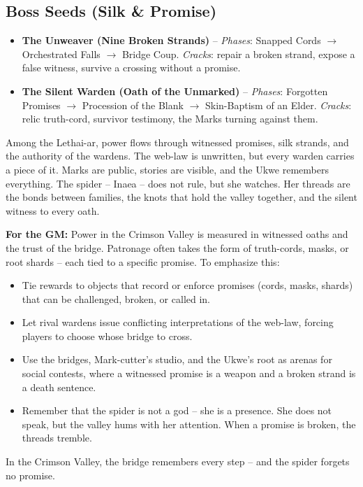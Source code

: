 \subsection*{Boss Seeds (Silk \& Promise)}
\begin{itemize}
\item \textbf{The Unweaver (Nine Broken Strands)} -- \emph{Phases}: Snapped Cords \(\rightarrow\) Orchestrated Falls \(\rightarrow\) Bridge Coup. \emph{Cracks}: repair a broken strand, expose a false witness, survive a crossing without a promise.
\item \textbf{The Silent Warden (Oath of the Unmarked)} -- \emph{Phases}: Forgotten Promises \(\rightarrow\) Procession of the Blank \(\rightarrow\) Skin-Baptism of an Elder. \emph{Cracks}: relic truth-cord, survivor testimony, the Marks turning against them.
\end{itemize}

\begin{tcolorbox}[colback=black!3,colframe=black!40!white,title={Patronage \& Power},breakable]
Among the Lethai-ar, power flows through witnessed promises, silk strands, and the authority of the wardens. The web-law is unwritten, but every warden carries a piece of it. Marks are public, stories are visible, and the Ukwe remembers everything. The spider -- Inaea -- does not rule, but she watches. Her threads are the bonds between families, the knots that hold the valley together, and the silent witness to every oath.

\textbf{For the GM:} Power in the Crimson Valley is measured in witnessed oaths and the trust of the bridge. Patronage often takes the form of truth-cords, masks, or root shards -- each tied to a specific promise. To emphasize this:
\begin{itemize}
\item Tie rewards to objects that record or enforce promises (cords, masks, shards) that can be challenged, broken, or called in.
\item Let rival wardens issue conflicting interpretations of the web-law, forcing players to choose whose bridge to cross.
\item Use the bridges, Mark-cutter's studio, and the Ukwe's root as arenas for social contests, where a witnessed promise is a weapon and a broken strand is a death sentence.
\item Remember that the spider is not a god -- she is a presence. She does not speak, but the valley hums with her attention. When a promise is broken, the threads tremble.
\end{itemize}
In the Crimson Valley, the bridge remembers every step -- and the spider forgets no promise.
\end{tcolorbox}

